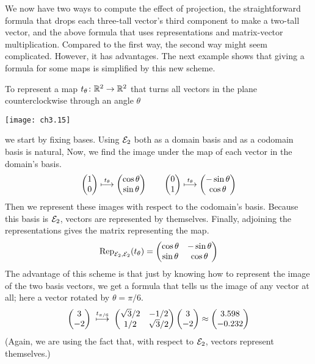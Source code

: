 We now have two ways to compute the effect of projection,
the straightforward formula that drops each three-tall vector's third component
to make a two-tall vector, 
and the above formula that uses representations and matrix-vector 
multiplication.
Compared to the first way, the second way might seem complicated.
However, it has advantages.
The next example shows that giving a formula for some maps is 
simplified by this new scheme.  

\begin{example} \label{exam:RepsOfRigidPlaneMaps}
To represent a  
map $\map{t_{\theta}}{\Re^2}{\Re^2}$ that 
turns all vectors in the plane counterclockwise through an angle $\theta$
\begin{center}  \small
  \texttt{[image: ch3.15]}
\end{center}
we start by fixing bases.
Using $\stdbasis_2$ both as a domain basis and as a codomain basis is natural,
Now, we find the image under the map of each
vector in the domain's basis.
\begin{equation*}
  \colvec{1 \\ 0}\mapsunder{t_\theta}\colvec{\cos\theta \\ \sin\theta}
  \qquad
  \colvec{0 \\ 1}\mapsunder{t_\theta}\colvec{-\sin\theta \\ \cos\theta}
\end{equation*}
Then we represent these images with respect to the codomain's basis.
Because this basis is $\stdbasis_2$, vectors are represented by themselves.
Finally, adjoining the representations gives the matrix representing the map.
\begin{equation*}
  \rep{t_\theta}{\stdbasis_2,\stdbasis_2}
  =
  \begin{pmatrix}
    \cos\theta  &-\sin\theta \\
    \sin\theta  &\cos\theta
  \end{pmatrix}
\end{equation*}
The advantage of this scheme is that just by knowing how to
represent the image of the two basis vectors, 
we get a formula that tells us the image of any vector at 
all; here a vector rotated by $\theta=\pi/6$.
\begin{equation*}
  \colvec{3  \\ -2}\;\mapsunder{t_{\pi/6}}\;
  \begin{pmatrix}
    \sqrt{3}/2  &-1/2  \\
     1/2        &\sqrt{3}/2
  \end{pmatrix}
  \colvec{3  \\ -2}
  \approx
  \colvec{3.598 \\ -0.232}  
\end{equation*}
(Again, we are using the fact that, with respect to $\stdbasis_2$, 
vectors represent themselves.)
\end{example}

